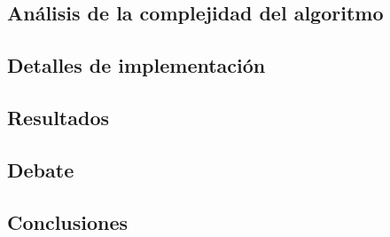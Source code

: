 \subsection{Análisis de la complejidad del algoritmo}
\label{complejidad2}

\subsection{Detalles de implementación}
\label{imp2}

\subsection{Resultados}
\label{res2}

\subsection{Debate}
\label{deb2}

\subsection{Conclusiones}
\label{conc2}
